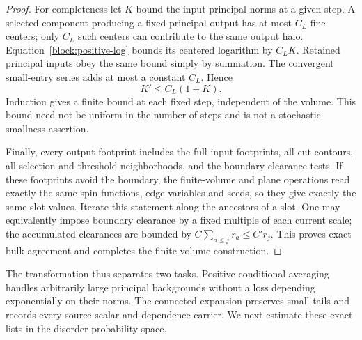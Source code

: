 \begin{proof}
For completeness let $K$ bound the input principal norms at a given
step.  A selected component producing a fixed principal output has
at most $C_L$ fine centers; only $C_L$ such centers can contribute to
the same output halo.  Equation~\eqref{block:positive-log} bounds its
centered logarithm by $C_LK$.  Retained principal inputs obey the
same bound simply by summation.  The convergent small-entry series
adds at most a constant $C_L$.  Hence
\begin{equation}
 K'\le C_L(1+K).
 \label{block:finite-principal-bound}
\end{equation}
Induction gives a finite bound at each fixed step, independent of the
volume.  This bound need not be uniform in the number of steps and is
not a stochastic smallness assertion.

Finally, every output footprint includes the full input footprints,
all cut contours, all selection and threshold neighborhoods, and the
boundary-clearance tests.  If these footprints avoid the boundary,
the finite-volume and plane operations read exactly the same spin
functions, edge variables and seeds, so they give exactly the same
slot values.  Iterate this statement along the ancestors of a slot.
One may equivalently impose boundary clearance by a fixed multiple
of each current scale; the accumulated clearances are bounded by
$C\sum_{a\le j}r_a\le C'r_j$.  This proves exact bulk agreement and
completes the finite-volume construction.
\end{proof}

The transformation thus separates two tasks.  Positive conditional
averaging handles arbitrarily large principal backgrounds without a
loss depending exponentially on their norms.  The connected expansion
preserves small tails and records every source scalar and dependence
carrier.  We next estimate these exact lists in the disorder probability
space.

